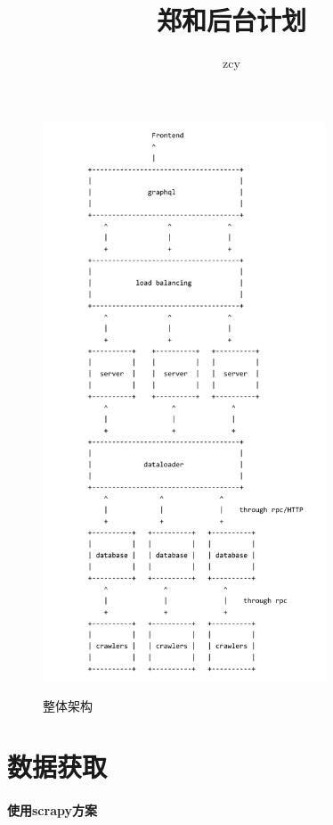 \documentclass[UTF8]{ctexrep}
\title{郑和后台计划}
\author{zcy}
\begin{document}
\maketitle
\newpage


\begin{figure}[h]
    \caption{整体架构}
    \centering
    \includegraphics[width=0.75\textwidth]{assets/figures/arch2.png}
    \label{fig:arch}
\end{figure}

\part{数据获取}

\subsection{使用scrapy方案}
\end{document}
